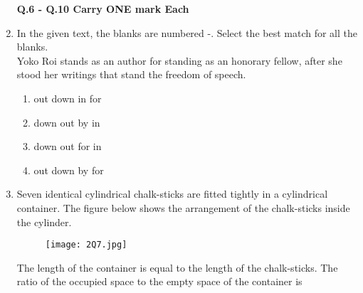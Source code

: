 \documentclass[journal,12pt,onecolumn]{article}
\theoremstyle{remark}
\begin{document}
\begin{enumerate}
    \textbf{Q.6 - Q.10 Carry ONE mark Each}
    \item In the given text, the blanks are numbered -. Select the best match for
    all the blanks.\\
    Yoko Roi stands \underline{\hspace{1cm}}  as an author for standing \underline{\hspace{1cm}}  as an honorary
    fellow, after she stood \underline{\hspace{1cm}}   her writings that stand \underline{\hspace{1cm}}  the freedom of
    speech.
    
    \hfill{}
    \begin{enumerate}
        \item {} out  down  in  for
        \item {} down  out  by  in
        \item {} down  out  for  in
        \item {} out  down  by  for
    \end{enumerate}

    \item Seven identical cylindrical chalk-sticks are fitted tightly in a cylindrical container.
    The figure  below shows the arrangement of the chalk-sticks inside the cylinder.
    \begin{figure}[H]
        \centering
        \texttt{[image: 2Q7.jpg]}
        \caption{}
        \label{fig:q7}
    \end{figure}
    The length of the container is equal to the length of the chalk-sticks. The ratio of the occupied space to the empty space of the container is
    
    \hfill{}
    \begin{enumerate}
    \end{enumerate}


\end{enumerate}
\end{document}
